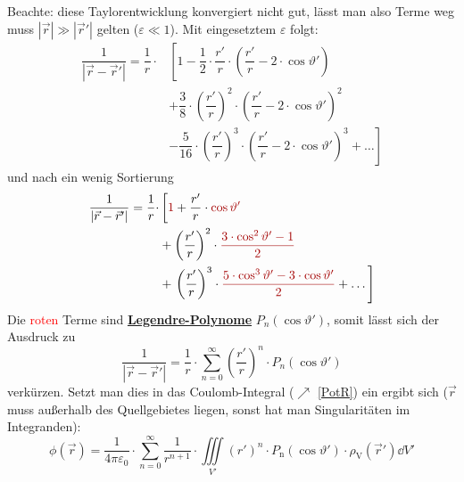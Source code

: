 	  Beachte: diese Taylorentwicklung konvergiert nicht gut, lässt man also Terme weg muss \(\left| \vec{r}  \right| \gg \left| \vec{r}'  \right| \) gelten (\(\varepsilon\ll 1\)). Mit eingesetztem \(\varepsilon\) folgt:
	  \begin{equation*}
		  \begin{split}
			  \dfrac{1}{\left| \vec{r}  - \vec{r}'  \right|}
			  = \dfrac{1}{r} \cdot &\left[ 1
				  - \dfrac{1}{2} \cdot \dfrac{ r'}{r} \cdot \left( \dfrac{ r'}{r} - 2 \cdot \cos \vartheta' \right) \right. \\
				  &+ \dfrac{3}{8} \cdot \left( \dfrac{ r'}{r} \right)^2 \cdot \left( \dfrac{ r'}{r} - 2 \cdot \cos \vartheta' \right)^2 \\
				  &\left. - \dfrac{5}{16} \cdot \left( \dfrac{ r'}{r} \right)^3 \cdot \left( \dfrac{ r'}{r} - 2 \cdot \cos \vartheta' \right)^3  + \dots \right]
		  \end{split}
	  \end{equation*}
	  und nach ein wenig Sortierung
	  \begin{equation*}\begin{split}
			  \begin{split}
				  \dfrac{1}{\left| \vec{r}  - \vec{r}'  \right|}
				  = \dfrac{1}{r} \cdot &\left[ \textcolor{red}{1}
					  + \dfrac{ r'}{r} \cdot \textcolor{red}{\cos \vartheta'} \right. \\
					  &+ \left(\dfrac{ r'}{r}\right)^2 \cdot \textcolor{red}{\dfrac{3 \cdot \cos^2 \vartheta' - 1}{2}} \\
					  &+ \left. \left(\dfrac{ r'}{r}\right)^3 \cdot \textcolor{red}{\dfrac{5 \cdot \cos^3 \vartheta' - 3 \cdot \cos \vartheta'}{2}}  + \dots \right]
			  \end{split}
		  \end{split}\end{equation*}
	  Die \textcolor{red}{roten} Terme sind \href{https://de.wikipedia.org/wiki/Legendre-Polynom}{\textbf{Legendre-Polynome}} \(P_{n}(\cos \vartheta')\), somit lässt sich der Ausdruck zu
	  \begin{equation*}
		  \dfrac{1}{\left| \vec{r}  - \vec{r}'  \right|}
		  = \dfrac{1}{r} \cdot \sum\limits_{n=0}^{\infty} \left( \dfrac{ r'}{r} \right)^n \cdot P_n(\cos \vartheta')
	  \end{equation*}
	  verkürzen. Setzt man dies in das Coulomb-Integral ($\nearrow$ \ref{PotR}) ein ergibt sich ($\vec{r}$ muss außerhalb des Quellgebietes liegen, sonst hat man Singularitäten im Integranden):
	  \begin{equation}
		  \boxed{\phi(\vec{r} ) = \frac{1}{4\pi\varepsilon_0} \cdot \sum\limits_{n = 0}^{\infty} \dfrac{1}{r^{n+1}} \cdot \iiint\limits_{V'} ( r')^n \cdot P_\mathrm{n}(\cos \vartheta') \cdot \rho_\text{V}(\vec{r}' ) \dd V'}
	  \end{equation}
